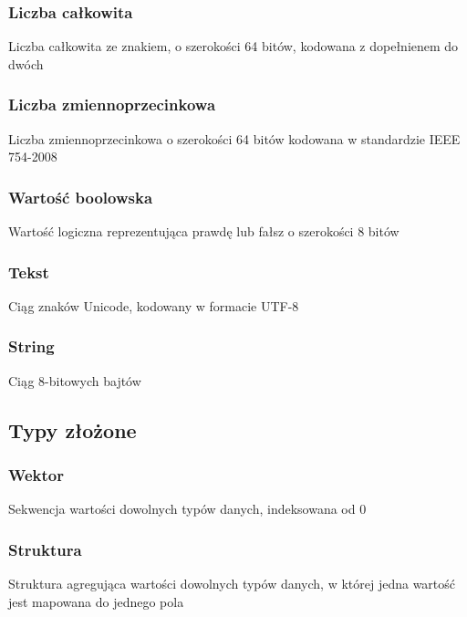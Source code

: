\subsubsection{Liczba całkowita}

Liczba całkowita ze znakiem, o szerokości 64 bitów, kodowana z dopełnienem do dwóch

\subsubsection{Liczba zmiennoprzecinkowa}

Liczba zmiennoprzecinkowa o szerokości 64 bitów kodowana w standardzie IEEE 754-2008

\subsubsection{Wartość boolowska}

Wartość logiczna reprezentująca prawdę lub fałsz o szerokości 8 bitów

\subsubsection{Tekst}

Ciąg znaków Unicode, kodowany w formacie UTF-8

\subsubsection{String}

Ciąg 8-bitowych bajtów

\subsection{Typy złożone}

\subsubsection{Wektor}

Sekwencja wartości dowolnych typów danych, indeksowana od 0

\subsubsection{Struktura}

Struktura agregująca wartości dowolnych typów danych, w której jedna
wartość jest mapowana do jednego pola

